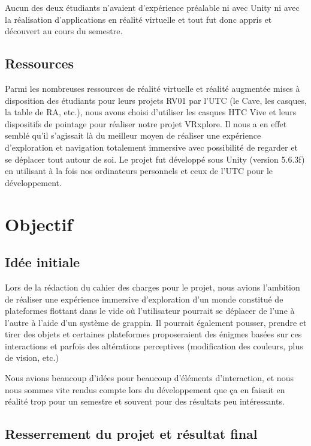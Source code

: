 \documentclass[a4paper]{elsarticle}
\begin{document}
Aucun des deux étudiants n’avaient d’expérience préalable ni avec Unity ni avec la réalisation d’applications en réalité virtuelle et tout fut donc appris et découvert au cours du semestre.

\subsection{Ressources}

Parmi les nombreuses ressources de réalité virtuelle et réalité augmentée mises à disposition des étudiants pour leurs projets RV01 par l’UTC (le Cave, les casques, la table de RA, etc.), nous avons choisi d’utiliser les casques HTC Vive et leurs dispositifs de pointage pour réaliser notre projet VRxplore. Il nous a en effet semblé qu’il s’agissait là du meilleur moyen de réaliser une expérience d’exploration et navigation totalement immersive avec possibilité de regarder et se déplacer tout autour de soi. Le projet fut développé sous Unity (version 5.6.3f) en utilisant à la fois nos ordinateurs personnels et ceux de l’UTC pour le développement.


\section{Objectif}

\subsection{Idée initiale}

Lors de la rédaction du cahier des charges pour le projet, nous avions l’ambition de réaliser une expérience immersive d’exploration d’un monde constitué de plateformes flottant dans le vide où l’utilisateur pourrait se déplacer de l’une à l’autre à l’aide d’un système de grappin. Il pourrait également pousser, prendre et tirer des objets et certaines plateformes proposeraient des énigmes basées sur ces interactions et parfois des altérations perceptives (modification des couleurs, plus de vision, etc.)
    
Nous avions beaucoup d’idées pour beaucoup d’éléments d’interaction, et nous nous sommes vite rendus compte lors du développement que ça en faisait en réalité trop pour un semestre et souvent pour des résultats peu intéressants.
    
\subsection{Resserrement du projet et résultat final}
\end{document}
